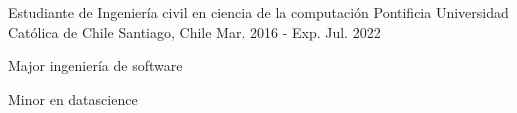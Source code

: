 

\begin{cventries}

  \cventry
    {Estudiante de Ingeniería civil en ciencia de la computación} %
    {Pontificia Universidad Católica de Chile} %
    {Santiago, Chile} %
    {Mar. 2016 - Exp. Jul. 2022} %
    {
      \begin{cvitems} %
        \item {Major ingeniería de software}
        \item {Minor en datascience}
      \end{cvitems}
    }

\end{cventries}

